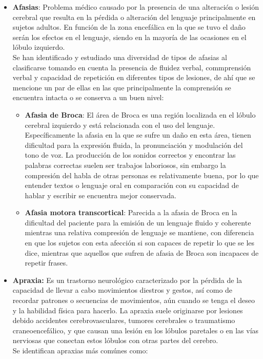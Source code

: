 \begin{itemize}
	\item \textbf{Afasias}: Problema médico causado por la presencia de una alteración o lesión cerebral que resulta en la pérdida o alteración del lenguaje principalmente en sujetos adultos. En función de la zona encefálica en la que se tuvo el daño serán los efectos en el lenguaje, siendo en la mayoría de las ocasiones en el lóbulo izquierdo. \\ Se han identificado y estudiado una diversidad de tipos de afasias al clasificarse tomando en cuenta la presencia de fluidez verbal, commprensión verbal y capacidad de repetición en diferentes tipos de lesiones, de ahí que se mencione un par de ellas en las que principalmente la comprensión se encuentra intacta o se conserva a un buen nivel:
	\begin{itemize}
		\item \textbf{Afasia de Broca}: El área de Broca es una región localizada en el lóbulo cerebral izquierdo y está relacionada con el uso del lenguaje. Específicamente la afasia en la que se sufre un daño en esta área, tienen dificultad para la expresión fluida, la pronunciación y modulación del tono de voz. La producción de los sonidos correctos y encontrar las palabras correctas suelen ser trabajos laboriosos, sin embargo la compresión del habla de otras personas es relativamente buena, por lo que entender textos o lenguaje oral en comparación con su capacidad de hablar y escribir se encuentra mejor conservada.
		\item \textbf{Afasia motora transcortical}: Parecida a la afasia de Broca en la dificultad del paciente para la emisión de un lenguaje fluido y coherente mientras una relativa compresión de lenguaje se mantiene, con diferencia en que los sujetos con esta afección si son capaces de repetir lo que se les dice, mientras que aquellos que sufren de afasia de Broca son incapaces de repetir frases.
	\end{itemize}
	\item \textbf{Apraxia:} Es un trastorno neurológico caracterizado por la pérdida de la capacidad de llevar a cabo movimientos diestros y gestos, así como de recordar patrones o secuencias de movimientos, aún cuando se tenga el deseo y la habilidad física para hacerlo. La apraxia suele originarse por lesiones debido accidentes cerebrovasculares, tumores cerebrales o traumatismo craneoencefálico, y que causan una lesión en los lóbulos paretales o en las vías nerviosas que conectan estos lóbulos con otras partes del cerebro. \\ Se identifican apraxias más comúnes como:

\end{itemize}
